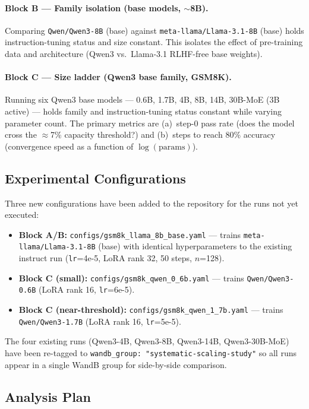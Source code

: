 \documentclass[12pt,a4paper]{report}
\theoremstyle{definition}
\begin{document}
\paragraph{Block B --- Family isolation (base models, $\sim$8B).}
Comparing \texttt{Qwen/Qwen3-8B} (base) against \texttt{meta-llama/Llama-3.1-8B} (base) holds instruction-tuning status and size constant.  This isolates the effect of pre-training data and architecture (Qwen3 vs.\ Llama-3.1 RLHF-free base weights).

\paragraph{Block C --- Size ladder (Qwen3 base family, GSM8K).}
Running six Qwen3 base models --- 0.6B, 1.7B, 4B, 8B, 14B, 30B-MoE (3B active) --- holds family and instruction-tuning status constant while varying parameter count.  The primary metrics are (a)~step-0 pass rate (does the model cross the $\approx$7\% capacity threshold?) and (b)~steps to reach 80\% accuracy (convergence speed as a function of $\log(\text{params})$).

\subsection{Experimental Configurations}

Three new configurations have been added to the repository for the runs not yet executed:

\begin{itemize}
    \item \textbf{Block A/B:} \texttt{configs/gsm8k\_llama\_8b\_base.yaml} --- trains \texttt{meta-llama/Llama-3.1-8B} (base) with identical hyperparameters to the existing instruct run (\texttt{lr}=4e-5, LoRA rank 32, 50 steps, $n$=128).
    \item \textbf{Block C (small):} \texttt{configs/gsm8k\_qwen\_0\_6b.yaml} --- trains \texttt{Qwen/Qwen3-0.6B} (LoRA rank 16, \texttt{lr}=6e-5).
    \item \textbf{Block C (near-threshold):} \texttt{configs/gsm8k\_qwen\_1\_7b.yaml} --- trains \texttt{Qwen/Qwen3-1.7B} (LoRA rank 16, \texttt{lr}=5e-5).
\end{itemize}

The four existing runs (Qwen3-4B, Qwen3-8B, Qwen3-14B, Qwen3-30B-MoE) have been re-tagged to \texttt{wandb\_group: "systematic-scaling-study"} so all runs appear in a single WandB group for side-by-side comparison.

\subsection{Analysis Plan}
\end{document}
